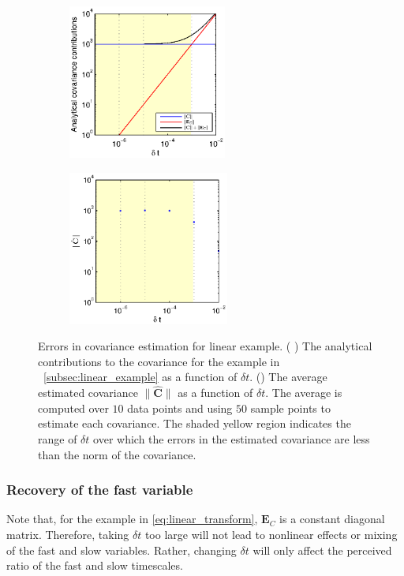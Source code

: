 \begin{figure}[t]
\centering
\begin{subfigure}{0.4\textwidth}
\centering
\includegraphics[height=2in]{C_dt_analytical_linear}
\caption{}
\label{subfig:cov_error1}
\end{subfigure}
%
\begin{subfigure}{0.4\textwidth}
\centering
\includegraphics[height=2in]{C_dt_linear}
\caption{}
\label{subfig:cov_error2}
\end{subfigure}
%
\caption[Errors in covariance estimation for linear multiscale example]{Errors in covariance estimation for linear example. (
) The analytical contributions to the covariance for the example in \sec~\ref{subsec:linear_example} as a function of $\delta t$. () The average estimated covariance $\| \hat{ \mathbf{C}} \|$ as a function of $\delta t$. The average is computed over $10$ data points and using $50$ sample points to estimate each covariance. The shaded yellow region indicates the range of $\delta t$ over which the errors in the estimated covariance are less than the norm of the covariance. }
\label{fig:cov_error}
\end{figure}

\subsubsection{Recovery of the fast variable} \label{subsec:fastvar}

Note that, for the example in \eqref{eq:linear_transform}, $\mathbf{E}_C$ is a constant diagonal matrix.
%
Therefore, taking $\delta t$ too large will not lead to nonlinear effects or mixing of the fast and slow variables.
%
Rather, changing $\delta t$ will only affect the perceived ratio of the fast and slow timescales.

